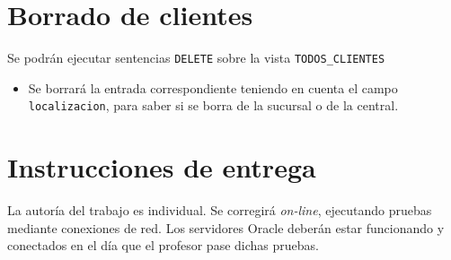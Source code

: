 \documentclass[a4paper]{article}
\begin{document}
\section{Borrado de clientes}
\label{sec:org0000018}
Se podrán ejecutar sentencias \texttt{DELETE} sobre la vista \texttt{TODOS\_CLIENTES}
\begin{itemize}
\item Se borrará la entrada correspondiente teniendo en cuenta el campo \texttt{localizacion}, para saber si se borra de la sucursal o de la central.
\end{itemize}

\section{Instrucciones de entrega}
\label{sec:org000001b}
La autoría del trabajo es individual. Se corregirá \emph{on-line}, ejecutando pruebas mediante conexiones de red. Los servidores Oracle deberán estar funcionando y conectados en el día que el profesor pase dichas pruebas.
\end{document}

